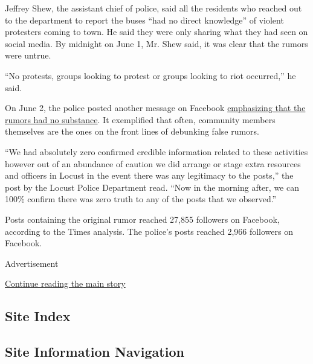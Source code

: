 Jeffrey Shew, the assistant chief of police, said all the residents who
reached out to the department to report the buses ``had no direct
knowledge'' of violent protesters coming to town. He said they were only
sharing what they had seen on social media. By midnight on June 1, Mr.
Shew said, it was clear that the rumors were untrue.

``No protests, groups looking to protest or groups looking to riot
occurred,'' he said.

On June 2, the police posted another message on Facebook
\href{https://www.facebookcorewwwi.onion/permalink.php?story_fbid=3051048361624116\&id=971105932951713\&__xts__\%5B0\%5D=68.ARDOEJsYdf3LZ57Mi_zK-u33tmrlZaw_x9KMCh5_NzQXPBb1nuyBH6YVwtdTbLc8YVnQGAkpd25IIKuPhL2W93GP3WSmtImjE-1swyUdUauEgSINmBVt4xHFgS4JWicuyCMHHwGWzfbB46xQBUCDSjvs3vChZs9S6WW5U0zrf_BHsPe-X0MAcnm0mPxIoOMRB3Uw21GLz0B2PN-leSVawzpWWdAV11WD5kmnT5IMPIE-wbI0FDSmdEVilltF7ZwEcUSwuss1EryU3EwDjblvWXFrTxLYJP-6szS5Q431m1JNc8Cu7P0Pc8s_mu6ba17ruAe8dpWtD16Yejh9g9Bf_w\&__tn__=-R}{emphasizing
that the rumors had no substance}. It exemplified that often, community
members themselves are the ones on the front lines of debunking false
rumors.

``We had absolutely zero confirmed credible information related to these
activities however out of an abundance of caution we did arrange or
stage extra resources and officers in Locust in the event there was any
legitimacy to the posts,'' the post by the Locust Police Department
read. ``Now in the morning after, we can 100\% confirm there was zero
truth to any of the posts that we observed.''

Posts containing the original rumor reached 27,855 followers on
Facebook, according to the Times analysis. The police's posts reached
2,966 followers on Facebook.

Advertisement

\protect\hyperlink{after-bottom}{Continue reading the main story}

\hypertarget{site-index}{%
\subsection{Site Index}\label{site-index}}

\hypertarget{site-information-navigation}{%
\subsection{Site Information
Navigation}\label{site-information-navigation}}

